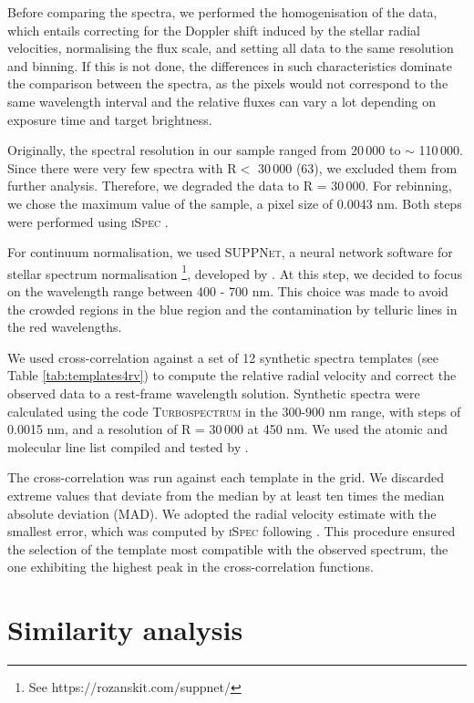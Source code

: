 \documentclass{aa}
\begin{document}
Before comparing the spectra, we performed the homogenisation of the data, which entails correcting for the Doppler shift induced by the stellar radial velocities, normalising the flux scale, and setting all data to the same resolution and binning. If this is not done, the differences in such characteristics dominate the comparison between the spectra, as the pixels would not correspond to the same wavelength interval and the relative fluxes can vary a lot depending on exposure time and target brightness. 

Originally, the spectral resolution in our sample ranged from 20\,000 to $\sim$ 110\,000. Since there were very few spectra with R$<$ 30\,000 (63), we excluded them from further analysis. Therefore, we degraded the data to R = 30\,000. For rebinning, we chose the maximum value of the sample, a pixel size of 0.0043 nm. Both steps were performed using \textsc{iSpec} \citep{2014A&A...569A.111B, 2019MNRAS.486.2075B}.

For continuum normalisation, we used \textsc{SUPPNet}, a neural network software for stellar spectrum normalisation \footnote{See https://rozanskit.com/suppnet/}, developed by \cite{SUPPNet}. At this step, we decided to focus on the wavelength range between 400 - 700 nm. This choice was made to avoid the crowded regions in the blue region and the contamination by telluric lines in the red wavelengths. 

We used cross-correlation against a set of 12 synthetic spectra templates (see Table \ref{tab:templates4rv}) to compute the relative radial velocity and correct the observed data to a rest-frame wavelength solution. Synthetic spectra were calculated using the code \textsc{Turbospectrum} \citep{Turbospectrum} in the 300-900 nm range, with steps of 0.0015 nm, and a resolution of R = 30\,000 at 450 nm. We used the atomic and molecular line list compiled and tested by \citet{GiribaldiSmiljanic2023}. 

The cross-correlation was run against each template in the grid. We discarded extreme values that deviate from the median by at least ten times the median absolute deviation (MAD). We adopted the radial velocity estimate with the smallest error, which was computed by \textsc{iSpec} following \citet{2003MNRAS.342.1291Z}. This procedure ensured the selection of the template most compatible with the observed spectrum, the one exhibiting the highest peak in the cross-correlation functions.

\section{Similarity analysis}
\label{sec:method}
\end{document}

